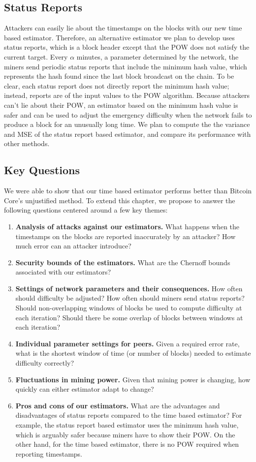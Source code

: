 \subsection{Status Reports}
Attackers can easily lie about the timestamps on the blocks with our new time based estimator. Therefore, an alternative estimator we plan to develop uses status reports, which is a block header except that the POW does not satisfy the current target. Every $\alpha$ minutes, a parameter determined by the network, the miners send periodic status reports that include the minimum hash value, which represents the hash found since the last block broadcast on the chain. To be clear, each status report does not directly report the minimum hash value; instead, reports are of the input values to the POW algorithm. Because attackers can't lie about their POW, an estimator based on the minimum hash value is safer and can be used to adjust the emergency difficulty when the network fails to produce a block for an unusually long time. We plan to compute the the variance and MSE of the status report based estimator, and compare its performance with other methods.

\subsection{Key Questions}
We were able to show that our time based estimator performs better than Bitcoin Core's unjustified method. To extend this chapter, we propose to answer the following questions centered around a few key themes:
\begin{enumerate}
\item \textbf{Analysis of attacks against our estimators.} What happens when the timestamps on the blocks are reported inaccurately by an attacker? How much error can an attacker introduce?
\item \textbf{Security bounds of the estimators.} What are the Chernoff bounds associated with our estimators?
\item \textbf{Settings of network parameters and their consequences.} How often should difficulty be adjusted? How often should miners send status reports? Should non-overlapping windows of blocks be used to compute difficulty at each iteration? Should there be some overlap of blocks between windows at each iteration?
\item \textbf{Individual parameter settings for peers.} Given a required error rate, what is the shortest window of time (or number of blocks) needed to estimate difficulty correctly?
\item \textbf{Fluctuations in mining power.} Given that mining power is changing, how quickly can either estimator adapt to change?
\item \textbf{Pros and cons of our estimators.} What are the advantages and disadvantages of status reports compared to the time based estimator? For example, the status report based estimator uses the minimum hash value, which is arguably safer because miners have to show their POW. On the other hand, for the time based estimator, there is no POW required when reporting timestamps.
\end{enumerate}

